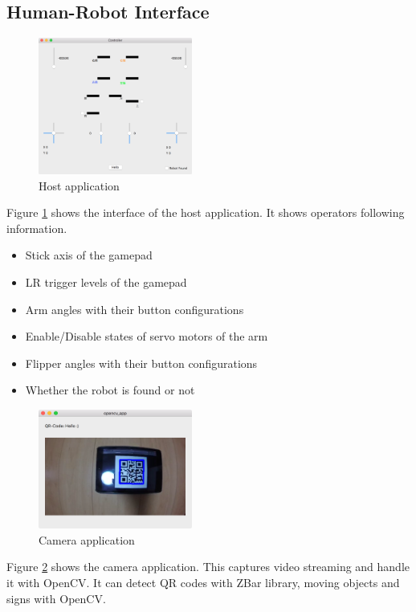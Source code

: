 \documentclass[journal]{IEEEtran}
\begin{document}
\subsection{Human-Robot Interface}
\begin{figure}[!t]
    \centering
    \includegraphics[width=0.45\textwidth]{controller.png}
    \caption{Host application} \label{fig:controller_app}
\end{figure}
Figure \ref{fig:controller_app} shows the interface of the host application.
It shows operators following information.
\begin{itemize}
    \item Stick axis of the gamepad
    \item LR trigger levels of the gamepad
    \item Arm angles with their button configurations
    \item Enable/Disable states of servo motors of the arm
    \item Flipper angles with their button configurations
    \item Whether the robot is found or not
\end{itemize}

\begin{figure}[!t]
    \centering
    \includegraphics[width=0.45\textwidth]{camera.png}
    \caption{Camera application} \label{fig:camera}
\end{figure}
Figure \ref{fig:camera} shows the camera application.
This captures video streaming and handle it with OpenCV.
It can detect QR codes with ZBar library, moving objects and signs with OpenCV.
\end{document}
